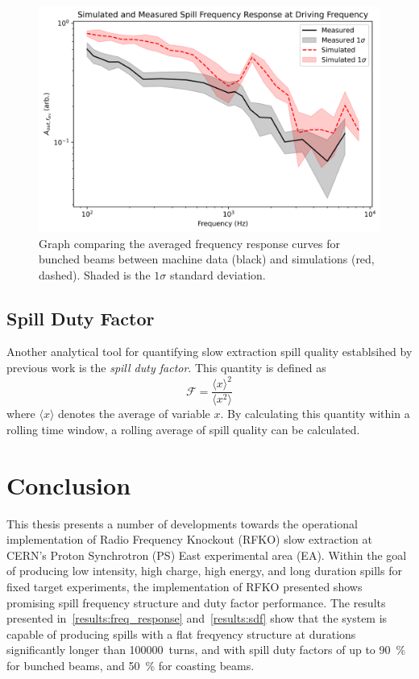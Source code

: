 \documentclass[11pt]{report}
\begin{document}
\begin{figure}
  \includegraphics*[width=0.9\linewidth]{simvmeas_bunched.png}
  \caption{Graph comparing the averaged frequency response curves for bunched beams between machine data (black) and simulations (red, dashed). Shaded is the $1\sigma$ standard deviation.}\label{fig:simvmeas_bunched}
\end{figure}

\section{Spill Duty Factor}\label{results:sdf}

Another analytical tool for quantifying slow extraction spill quality establsihed by previous work is the \textit{spill duty factor}. This quantity is defined as~\cite{Sorge_2018}
\begin{equation}
  \mathcal{F} = \frac{\langle x\rangle^2}{\langle x^2\rangle}
\end{equation} where $\langle x\rangle$ denotes the average of variable $x$. By calculating this quantity within a rolling time window, a rolling average of spill quality can be calculated. 

\chapter{Conclusion}

This thesis presents a number of developments towards the operational implementation of Radio Frequency Knockout (RFKO) slow extraction at CERN's Proton Synchrotron (PS) East experimental area (EA). Within the goal of producing low intensity, high charge, high energy, and long duration spills for fixed target experiments, the implementation of RFKO presented shows promising spill frequency structure and duty factor performance. The results presented in~\autoref{results:freq_response} and~\autoref{results:sdf} show that the system is capable of producing spills with a flat freqyency structure at durations significantly longer than \qty{100000}{turns}, and with spill duty factors of up to \qty{90}{\percent} for bunched beams, and \qty{50}{\percent} for coasting beams.
\end{document}
